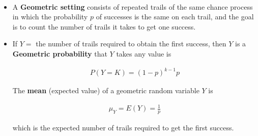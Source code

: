 \documentclass[Main.tex]{subfiles}
\begin{document}
	\begin{example} \hfill \\
		\begin{itemize}	
			\item A \textbf{Geometric setting} consists of repeated trails of the same chance process in which the probability $p$ of successes is the same on each trail, and the goal is to count the number of trails it takes to get one success.\hfill \\
			\item If $Y=$ the number of trails required to obtain the first success, then $Y$ is a \textbf{Geometric probability} that $Y$ takes any value is
			\begin{definition}\hfill
				\begin{subequations}
					\begin{align}
						P(Y=K)=(1-p)^{k-1}p
					\end{align}
				\end{subequations}\hfill	
			\end{definition}
			The \textbf{mean} (expected value) of a geometric random variable $Y$ is
			\begin{definition}\hfill
				\begin{subequations}
					\begin{align}
						\mu_{Y}=E(Y)=\frac{1}{p}
					\end{align}
				\end{subequations}\hfill	
			\end{definition}
			which is the expected number of trails required to get the first success.						
		\end{itemize}
	\end{example}													
\end{document}
